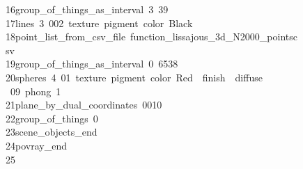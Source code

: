 \begin{tabbing}
16\>\>\>group\_of\_things\_as\_interval\ 3\ 39\ \\[0pt]
17\>\>\>lines\ 3\ 002\ texture\ pigment\ color\ Black\ \ \ \\[0pt]
18\>\>\>point\_list\_from\_csv\_file\ function\_lissajous\_3d\_N2000\_pointsc\\[0pt]
\>sv\ \\[0pt]
19\>\>\>group\_of\_things\_as\_interval\ 0\ 6538\\[0pt]
20\>\>\>spheres\ 4\ 01\ texture\ pigment\ color\ Red\ \ finish\ \ diffuse\\[0pt]
\>\ 09\ phong\ 1\ \\[0pt]
21\>\>\>plane\_by\_dual\_coordinates\ 0010\ \\[0pt]
22\>\>\>group\_of\_things\ 0\ \\[0pt]
23\>\>scene\_objects\_end\ \\[0pt]
24\>\>povray\_end\\[0pt]
25\>\end{tabbing}
